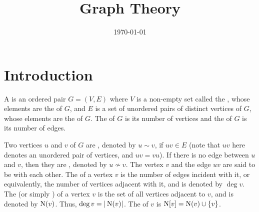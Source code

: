 
\title{\textbf{Graph Theory}}

\date{\today}
\maketitle

\begingroup
\let\clearpage\relax
\tableofcontents
\endgroup

\clearpage

\renewcommand{\nomname}{List of Symbols}



\printnomenclature[10em]

\clearpage

\section{Introduction}\label{sec:Intro}
A  is an ordered pair $G = (V, E)$ where $V$ is a non-empty set called the , whose elements are the  of $G$, and $E$ is a set of unordered pairs of distinct vertices of $G$, whose elements are the  of $G$. The  of $G$ is its number of vertices and the  of $G$ is its number of edges.

Two vertices $u$ and $v$ of $G$ are , denoted by $u \sim v$, if $uv \in E$ (note that $uv$ here denotes an unordered pair of vertices, and $uv = vu$). If there is no edge between $u$ and $v$, then they are , denoted by $u \nsim v$. The vertex $v$ and the edge $uv$ are said to be  with each other. The  of a vertex $v$ is the number of edges incident with it, or equivalently, the number of vertices adjacent with it, and is denoted by $\deg v$. The  (or simply ) of a vertex $v$ is the set of all vertices adjacent to $v$, and is denoted by $\operatorname{N}(v)$. Thus, $\deg v = |\operatorname{N}(v)|$. The  of $v$ is $\operatorname{N}[v] = \operatorname{N}(v) \cup \{v\}$.

